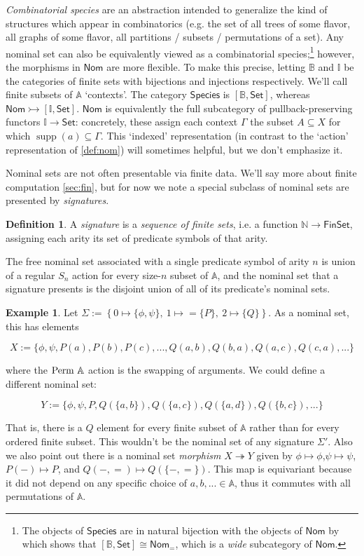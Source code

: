 \documentclass{article}
\theoremstyle{definition}
\newtheorem{definition}{Definition}[section]
\newtheorem{example}{Example}[section]
\newcommand{\N}{\mathbb{N}}
\newcommand{\A}{\mathbb{A}}
\newcommand{\BB}{\mathbb{B}}
\newcommand{\II}{\mathbb{I}}
\newcommand{\cat}[1]{\mathsf{#1}}
\newcommand{\Set}{\cat{Set}}
\newcommand{\Nom}{\cat{Nom}}
\newcommand{\PA}{{\rm Perm\ \A}}
\newcommand{\supp}{\operatorname{supp}}
\begin{document}
{\it Combinatorial species} \cite{joyal1981theorie} are an abstraction intended to generalize the kind of structures which appear in combinatorics (e.g. the set of all trees of some flavor, all graphs of some flavor, all partitions / subsets / permutations of a set). Any nominal set can also be equivalently viewed as a combinatorial species;\footnote{
The objects of $\cat{Species}$ are in natural bijection with the objects of $\cat{Nom}$ by \cite[Prop 7.4]{lenke2026unified} which shows that $[\BB,\Set] \cong \cat{Nom_=}$, which is a {\it wide} subcategory of $\Nom$. 
} however, the morphisms in $\Nom$ are more flexible. To make this precise, letting $\BB$ and $\II$ be the categories of finite sets with bijections and injections respectively. We'll call finite subsets of $\A$ `contexts'. The category $\cat{Species}$ is $[\BB,\Set]$, whereas $\cat{Nom}\rightarrowtail [\II,\Set]$. $\Nom$ is equivalently the full subcategory of pullback-preserving functors $\II\to \Set$: concretely, these assign each context $\Gamma$ the subset $A\subseteq X$ for which $\supp(a)\subseteq \Gamma$. This `indexed' representation (in contrast to the `action' representation of \cref{def:nom}) will sometimes helpful, but we don't emphasize it.

Nominal sets are not often presentable via finite data. We'll say more about finite computation \cref{sec:fin}, but for now we note a special subclass of nominal sets are presented by {\it signatures}.

\begin{definition}
    \label{def:sig}
    A {\it signature} is a {\it sequence of finite sets}, i.e. a function $\N\to \cat{FinSet}$, assigning each arity its set of predicate symbols of that arity.
\end{definition}

The free nominal set associated with a single predicate symbol of arity $n$ is union of a regular $S_n$ action for every size-$n$ subset of $\A$, and the nominal set that a signature presents is the disjoint union of all of its predicate's nominal sets. 

\begin{example}
    \label{ex:nomset}
    Let $\Sigma:=\left\{0\mapsto \{\phi,\psi\},\ 1\mapsto=\{P\},\ 2\mapsto\{Q\}\right\}$. As a nominal set, this has elements 
    
    $$X:=\{\phi,\psi,P(a),P(b),P(c),...,Q(a,b),Q(b,a),Q(a,c),Q(c,a),...\}$$

    where the $\PA$ action is the swapping of arguments. We could define a different nominal set: 

    $$Y:=\{\phi,\psi,P,Q(\{a,b\}),Q(\{a,c\}),Q(\{a,d\}), Q(\{b,c\}),...\}$$
    
    That is, there is a $Q$ element for every finite subset of $\A$ rather than for every ordered finite subset. This wouldn't be the nominal set of any signature $\Sigma'$. Also we also point out there is a nominal set {\it morphism} $X\twoheadrightarrow Y$ given by $\phi\mapsto\phi$,$\psi\mapsto\psi$,$P(-)\mapsto P$, and $Q(-,=)\mapsto Q(\{-,=\})$. This map is equivariant because it did not depend on any specific choice of $a,b,... \in \A$, thus it commutes with all permutations of $\A$. 
\end{example}
\end{document}
